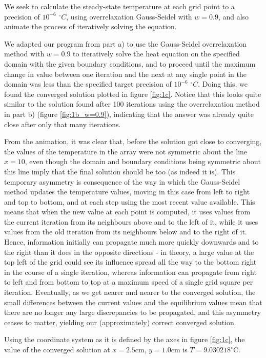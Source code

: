 \documentclass{article}
\begin{document}
We seek to calculate the steady-state temperature at each grid point to a precision of $10^{-6}$ $^\circ C$, using overrelaxation Gauss-Seidel with $w=0.9$, and also animate the process of iteratively solving the equation.

We adapted our program from part a) to use the Gauss-Seidel overrelaxation method with $w=0.9$ to iteratively solve the heat equation on the specified domain with the given boundary conditions, and to proceed until the maximum change in value between one iteration and the next at any single point in the domain was less than the specified target precision of $10^{-6}$ $^\circ C$. Doing this, we found the converged solution plotted in figure \ref{fig:1c}. Notice that this looks quite similar to the solution found after 100 iterations using the overrelaxation method in part b) (figure \ref{fig:1b_w=0.9}), indicating that the answer was already quite close after only that many iterations.

From the animation, it was clear that, before the solution got close to converging, the values of the temperature in the array were not symmetric about the line $x=10$, even though the domain and boundary conditions being symmetric about this line imply that the final solution should be too (as indeed it is). This temporary asymmetry is consequence of the way in which the Gauss-Seidel method updates the temperature values, moving in this case from left to right and top to bottom, and at each step using the most recent value available. This means that when the new value at each point is computed, it uses values from the current iteration from its neighbours above and to the left of it, while it uses values from the old iteration from its neighbours below and to the right of it. Hence, information initially can propagate much more quickly downwards and to the right than it does in the opposite directions - in theory, a large value at the top left of the grid could see its influence spread all the way to the bottom right in the course of a single iteration, whereas information can propagate from right to left and from bottom to top at a maximum speed of a single grid square per iteration. Eventually, as we get nearer and nearer to the converged solution, the small differences between the current values and the equilibrium values mean that there are no longer any large discrepancies to be propagated, and this asymmetry ceases to matter, yielding our (approximately) correct converged solution.

Using the coordinate system as it is defined by the axes in figure \ref{fig:1c}, the value of the converged solution at $x=2.5$cm, $y=1.0$cm is $T = 9.030218 ^\circ$C.
\end{document}
